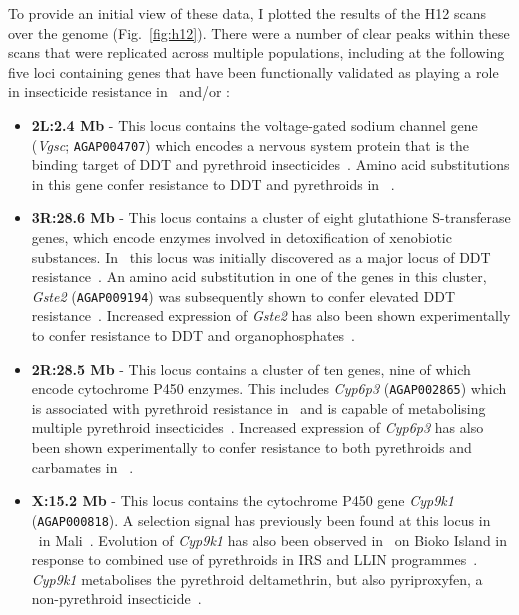 \begin{refsection}
To provide an initial view of these data, I plotted the results of the H12 scans over the genome (Fig.~\ref{fig:h12}).
%
There were a number of clear peaks within these scans that were replicated across multiple populations, including at the following five loci containing genes that have been functionally validated as playing a role in insecticide resistance in \agam\ and/or \acol:
%
\begin{itemize}
\item \textbf{2L:2.4 Mb} - This locus contains the voltage-gated sodium channel gene (\textit{Vgsc}; \texttt{AGAP004707}) which encodes a nervous system protein that is the binding target of DDT and pyrethroid insecticides~\parencite{Dong2014}.
%
Amino acid substitutions in this gene confer resistance to DDT and pyrethroids in \agam~\parencite{MartinezTorres1998,Ranson2000a,Davies2007,Lynd2010,Jones2012,Wang2015}.
\item \textbf{3R:28.6 Mb} - This locus contains a cluster of eight glutathione S-transferase genes, which encode enzymes involved in detoxification of xenobiotic substances.
%
In \agam\ this locus was initially discovered as a major locus of DDT resistance~\parencite{Prapanthadara1993,Ranson2000b,Ranson2001,Ding2003}.
%
An amino acid substitution in one of the genes in this cluster, \textit{Gste2} (\texttt{AGAP009194}) was subsequently shown to confer elevated DDT resistance~\parencite{Mitchell2014}.
%
Increased expression of \textit{Gste2} has also been shown experimentally to confer resistance to DDT and organophosphates~\parencite{Adolfi2019}.
\item \textbf{2R:28.5 Mb} - This locus contains a cluster of ten genes, nine of which encode cytochrome P450 enzymes.
%
This includes \textit{Cyp6p3} (\texttt{AGAP002865}) which is associated with pyrethroid resistance in \agam\ and is capable of metabolising multiple pyrethroid insecticides~\parencite{Muller2008}.
%
Increased expression of \textit{Cyp6p3} has also been shown experimentally to confer resistance to both pyrethroids and carbamates in \agam~\parencite{Adolfi2019}.
\item \textbf{X:15.2 Mb} - This locus contains the cytochrome P450 gene \textit{Cyp9k1} (\texttt{AGAP000818}).
%
A selection signal has previously been found at this locus in \acol\ in Mali~\parencite{Main2015}.
%
Evolution of \textit{Cyp9k1} has also been observed in \acol\ on Bioko Island in response to combined use of pyrethroids in IRS and LLIN programmes~\parencite{Vontas2018}.
%
\textit{Cyp9k1} metabolises the pyrethroid deltamethrin, but also pyriproxyfen, a non-pyrethroid insecticide~\parencite{Vontas2018}.

\end{itemize}
\end{refsection}
